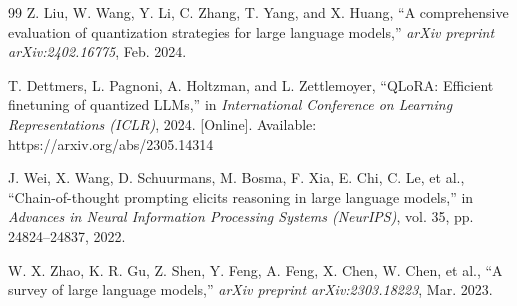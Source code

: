 \documentclass[journal]{IEEEtran}
\begin{document}
\begin{thebibliography}{99}
Z. Liu, W. Wang, Y. Li, C. Zhang, T. Yang, and X. Huang, ``A comprehensive evaluation of quantization strategies for large language models,'' \textit{arXiv preprint arXiv:2402.16775}, Feb. 2024.

T. Dettmers, L. Pagnoni, A. Holtzman, and L. Zettlemoyer, ``QLoRA: Efficient finetuning of quantized LLMs,'' in \textit{International Conference on Learning Representations (ICLR)}, 2024. [Online]. Available: https://arxiv.org/abs/2305.14314

J. Wei, X. Wang, D. Schuurmans, M. Bosma, F. Xia, E. Chi, C. Le, et al., ``Chain-of-thought prompting elicits reasoning in large language models,'' in \textit{Advances in Neural Information Processing Systems (NeurIPS)}, vol. 35, pp. 24824--24837, 2022.

W. X. Zhao, K. R. Gu, Z. Shen, Y. Feng, A. Feng, X. Chen, W. Chen, et al., ``A survey of large language models,'' \textit{arXiv preprint arXiv:2303.18223}, Mar. 2023.

\end{thebibliography}
\end{document}
